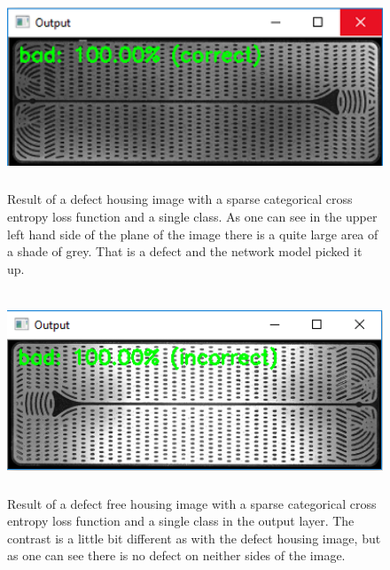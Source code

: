 \documentclass[12pt,a4paper,twoside]{report}
\begin{document}
\begin{figure}[h!]
	\centering
	\includegraphics[width=12cm, height=6cm]{img/data/exemplu_imagine_gata.jpg}
	\caption[]
	{Result of a defect housing image with a sparse categorical cross entropy loss function and a single class. As one can see in the upper left hand side of the plane of the image there is a quite large area of a shade of grey. That is a defect and the network model picked it up.}
	\label{fig:imaginerea}
\end{figure}

\begin{figure}[h!]
	\centering
	\includegraphics[width=12cm, height=6cm]{img/data/exemplu_imagine_gata_bun.png}
	\caption[]
	{Result of a defect free housing image with a sparse categorical cross entropy loss function and a single class in the output layer. The contrast is a little bit different as with the defect housing image, but as one can see there is no defect on neither sides of the image.}
	\label{fig:imaginebuna}
\end{figure}
\end{document}
